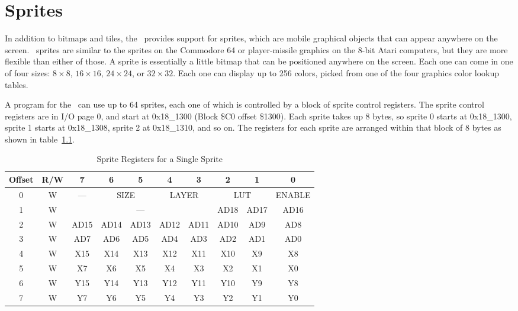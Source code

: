 \chapter{Sprites}

In addition to bitmaps and tiles, the \jr\ provides support for sprites, which are mobile graphical objects that can appear anywhere on the screen. \jr\ sprites are similar to the sprites on the Commodore 64 or player-missile graphics on the 8-bit Atari computers, but they are more flexible than either of those. A sprite is essentially a little bitmap that can be positioned anywhere on the screen. Each one can come in one of four sizes: $8 \times 8$, $16 \times 16$, $24 \times 24$, or $32 \times 32$. Each one can display up to 256 colors, picked from one of the four graphics color lookup tables.

A program for the \jr\ can use up to 64 sprites, each one of which is controlled by a block of sprite control registers. The sprite control registers are in I/O page 0, and start at 0x18\_1300 (Block \$C0 offset \$1300). Each sprite takes up 8 bytes, so sprite 0 starts at 0x18\_1300, sprite 1 starts at 0x18\_1308, sprite 2 at 0x18\_1310, and so on. The registers for each sprite are arranged within that block of 8 bytes as shown in table~\ref{tab:sp_reg}.

\begin{table}[ht]
    \begin{center}
        \begin{tabular}{|c|c|c|c|c|c|c|c|c|c|} \hline
            Offset & R/W & 7 & 6 & 5 & 4 & 3 & 2 & 1 & 0 \\ \hline\hline
            0 & W & --- & \multicolumn{2}{|c|}{SIZE} & \multicolumn{2}{|c|}{LAYER} & \multicolumn{2}{|c|}{LUT} & ENABLE \\ \hline
            1 & W & \multicolumn{5}{|c|}{---} & AD18 & AD17 & AD16 \\ \hline
            2 & W & AD15 & AD14 & AD13 & AD12 & AD11 & AD10 & AD9 & AD8 \\ \hline
            3 & W & AD7 & AD6 & AD5 & AD4 & AD3 & AD2 & AD1 & AD0 \\ \hline
            4 & W & X15 & X14 & X13 & X12 & X11 & X10 & X9 & X8 \\ \hline
            5 & W & X7 & X6 & X5 & X4 & X3 & X2 & X1 & X0 \\ \hline
            6 & W & Y15 & Y14 & Y13 & Y12 & Y11 & Y10 & Y9 & Y8 \\ \hline
            7 & W & Y7 & Y6 & Y5 & Y4 & Y3 & Y2 & Y1 & Y0 \\ \hline
        \end{tabular}
    \end{center}
    \caption{Sprite Registers for a Single Sprite}
    \label{tab:sp_reg}
\end{table}

